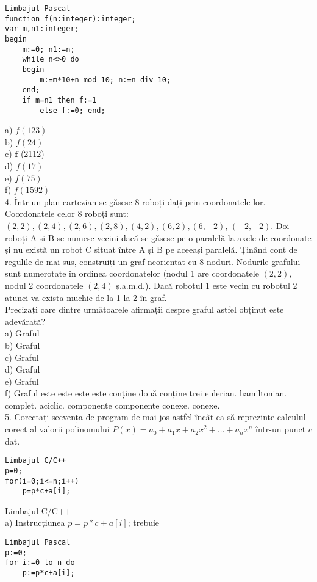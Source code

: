\begin{verbatim}
Limbajul Pascal
function f(n:integer):integer;
var m,n1:integer;
begin
    m:=0; n1:=n;
    while n<>0 do
    begin
        m:=m*10+n mod 10; n:=n div 10;
    end;
    if m=n1 then f:=1
        else f:=0; end;
\end{verbatim}

a) $f(123)$\\
b) $f(24)$\\
c) $\mathbf{f}$ (2112)\\
d) $f(17)$\\
e) $f(75)$\\
f) $f(1592)$\\
4. Într-un plan cartezian se găsesc 8 roboți dați prin coordonatele lor. Coordonatele celor 8 roboți sunt: $(2,2),(2,4),(2,6),(2,8),(4,2),(6,2),(6,-2)$, $(-2,-2)$. Doi roboți A și B se numesc vecini dacă se găsesc pe o paralelă la axele de coordonate și nu există un robot C situat între A și B pe aceeași paralelă. Ținând cont de regulile de mai sus, construiți un graf neorientat cu 8 noduri. Nodurile grafului sunt numerotate în ordinea coordonatelor (nodul 1 are coordonatele $(2,2)$, nodul 2 coordonatele $(2,4)$ ș.a.m.d.). Dacă robotul 1 este vecin cu robotul 2 atunci va exista muchie de la 1 la 2 în graf.\\
Precizați care dintre următoarele afirmații despre graful astfel obținut este adevărată?\\
a) Graful\\
b) Graful\\
c) Graful\\
d) Graful\\
e) Graful\\
f) Graful este este este este conține două conține trei eulerian. hamiltonian. complet. aciclic. componente componente conexe. conexe.\\
5. Corectați secvența de program de mai jos astfel încât ea să reprezinte calculul corect al valorii polinomului $P(x)=a_{0}+a_{1} x+a_{2} x^{2}+\ldots+a_{n} x^{n}$ într-un punct $c$ dat.

\begin{verbatim}
Limbajul C/C++
p=0;
for(i=0;i<=n;i++)
    p=p*c+a[i];
\end{verbatim}

Limbajul C/C++\\
a) Instrucțiunea $p=p * c+a[i]$; trebuie

\begin{verbatim}
Limbajul Pascal
p:=0;
for i:=0 to n do
    p:=p*c+a[i];
\end{verbatim}


